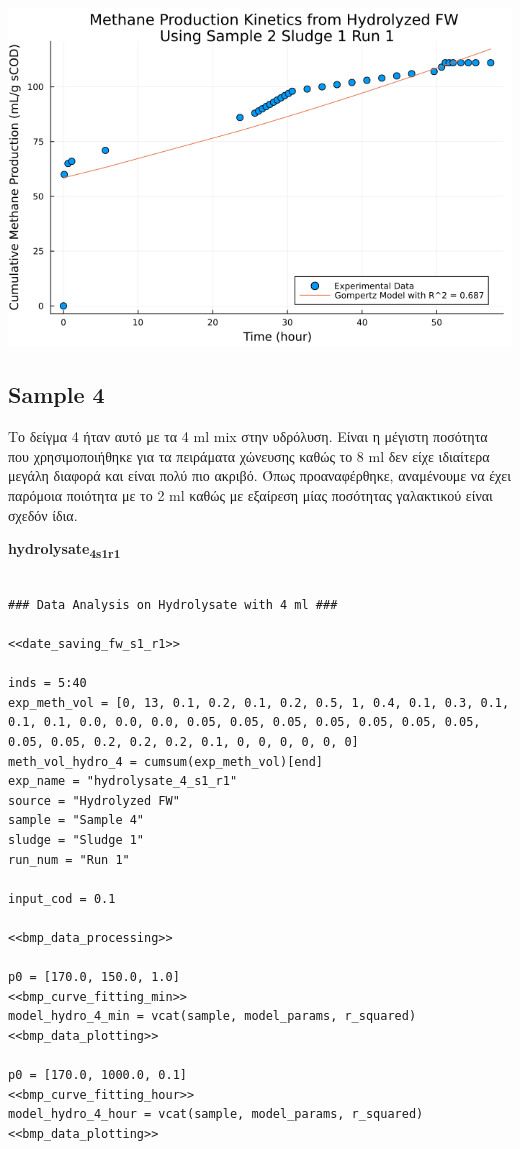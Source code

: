 \documentclass[11pt]{article}
\begin{document}
\begin{center}
\includegraphics[width=.9\linewidth]{../plots/BMPs/Hydrolyzed FW/methane_kinetics_hydrolysate_2_s1_r1_hour.png}
\end{center}

\subsection{Sample 4}
\label{sec:org954e793}
Το δείγμα 4 ήταν αυτό με τα 4 ml mix στην υδρόλυση. Είναι η μέγιστη ποσότητα που χρησιμοποιήθηκε για τα πειράματα χώνευσης καθώς το 8 ml δεν είχε ιδιαίτερα μεγάλη διαφορά και είναι πολύ πιο ακριβό. Όπως προαναφέρθηκε, αναμένουμε να έχει παρόμοια ποιότητα με το 2 ml καθώς με εξαίρεση μίας ποσότητας γαλακτικού είναι σχεδόν ίδια.

\textbf{hydrolysate\textsubscript{4}\textsubscript{s1}\textsubscript{r1}}
\begin{verbatim}

### Data Analysis on Hydrolysate with 4 ml ###

<<date_saving_fw_s1_r1>>

inds = 5:40
exp_meth_vol = [0, 13, 0.1, 0.2, 0.1, 0.2, 0.5, 1, 0.4, 0.1, 0.3, 0.1, 0.1, 0.1, 0.0, 0.0, 0.0, 0.05, 0.05, 0.05, 0.05, 0.05, 0.05, 0.05, 0.05, 0.05, 0.2, 0.2, 0.2, 0.1, 0, 0, 0, 0, 0, 0]
meth_vol_hydro_4 = cumsum(exp_meth_vol)[end]
exp_name = "hydrolysate_4_s1_r1"
source = "Hydrolyzed FW"
sample = "Sample 4"
sludge = "Sludge 1"
run_num = "Run 1"

input_cod = 0.1

<<bmp_data_processing>>

p0 = [170.0, 150.0, 1.0]
<<bmp_curve_fitting_min>>
model_hydro_4_min = vcat(sample, model_params, r_squared)
<<bmp_data_plotting>>

p0 = [170.0, 1000.0, 0.1]
<<bmp_curve_fitting_hour>>
model_hydro_4_hour = vcat(sample, model_params, r_squared)
<<bmp_data_plotting>>
\end{verbatim}
\end{document}
